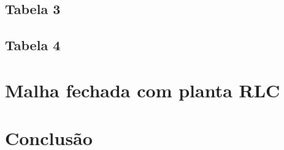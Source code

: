 \subsection{Tabela 3}




\subsection{Tabela 4}





\clearpage
\section{Malha fechada com planta RLC}


\section{Conclusão}
